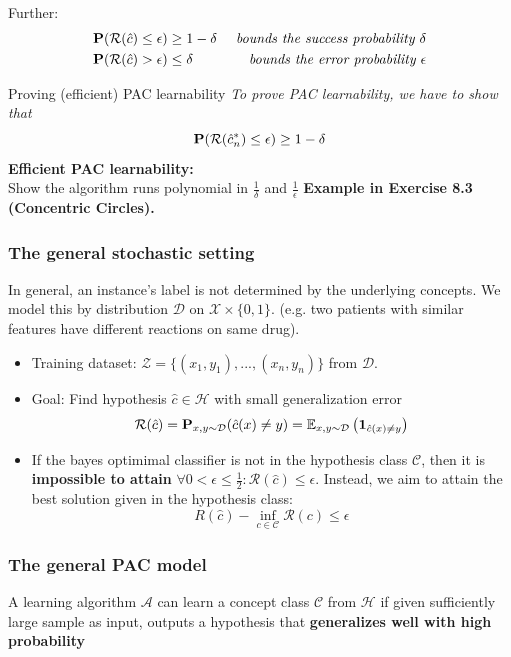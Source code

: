 Further: 
\begin{align*}
	\P(\mathcal R(\hat c)\leq \epsilon) &\geq 1 - \delta &\textit{ bounds the success probability $\delta$}\\
	\P(\mathcal R(\hat c)> \epsilon) &\leq \delta 		&\textit{ bounds the error probability $\epsilon$}
\end{align*}

\begin{highlight}{Proving (efficient) PAC learnability}
\textit{To prove PAC learnability, we have to show that}
$$
	\P(\mathcal R(\hat{c}_n^*) \leq \epsilon) \geq 1 -\delta
$$
\textbf{Efficient PAC learnability: }\\ 
Show the algorithm runs polynomial in $\frac{1}{\delta}$ and $\frac{1}{\epsilon}$
\sepline
\textbf{Example in Exercise 8.3 (Concentric Circles).}
\end{highlight}

\subsubsection{The general stochastic setting}
In general, an instance's label is not determined by the underlying concepts. We model this by distribution $\mathcal D$ on $\mathcal X\times \{0,1\}$. (e.g. two patients with similar features have different reactions on same drug).

\begin{itemize}
	\item Training dataset: $\mathcal Z=\{(x_1, y_1), ..., (x_n, y_n)\}$ from $\mathcal D$.
	\item Goal: Find hypothesis $\hat c\in \mathcal H$ with small generalization error 
	$$
		\mathcal R(\hat c) = \P_{x,y\sim \mathcal D}(\hat c(x)\neq y) = \E_{x,y\sim \mathcal D}\left(\mathbf 1_{\hat c(x)\neq y}\right)
	$$
	\item If the bayes optimimal classifier is not in the hypothesis class $\mathcal C$, then it is \textbf{impossible to attain} $\forall 0 < \epsilon \leq \frac{1}{2}:\mathcal R(\hat c)\leq \epsilon$. Instead, we aim to attain the best solution given in the hypothesis class:
	$$
		R(\hat c) - \inf_{c\in\mathcal C}\mathcal R(c) \leq \epsilon
	$$
\end{itemize}

\subsubsection{The general PAC model}
A learning algorithm $\mathcal A$ can learn a concept class $\mathcal C$ from $\mathcal H$ if given {\color{imp3}sufficiently large sample} as input, outputs a hypothesis that \textbf{{\color{imp}generalizes well} {\color{imp2}with high probability}}

